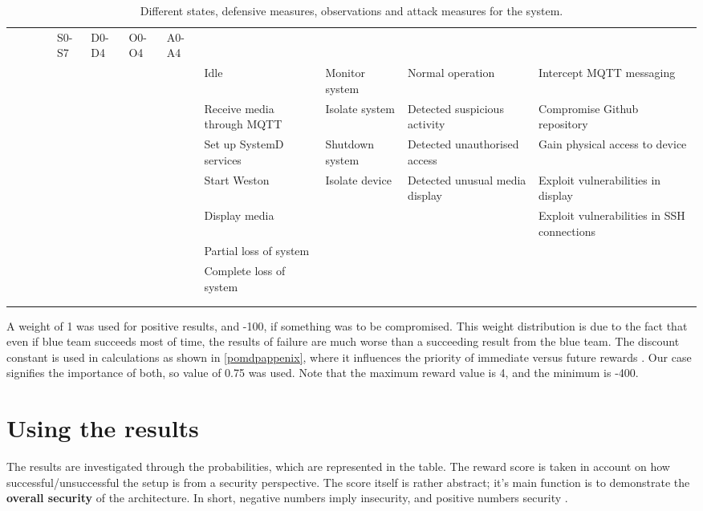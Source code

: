 \begin{landscape}
\begin{table}
\centering
\begin{tabular}{ |c|c|c|c| }
 \hline & & & & S0-S7 & D0-D4 & O0-O4 & A0-A4 \\ & & & & \hline \hline
 & & & & Idle & Monitor system & Normal operation & Intercept MQTT
 messaging \\ & & & & \hline & & & & Receive media through MQTT &
 Isolate system & Detected suspicious activity & Compromise Github
 repository \\ & & & & \hline & & & & Set up SystemD services &
 Shutdown system & Detected unauthorised access & Gain physical access
 to device \\ & & & & \hline & & & & Start Weston & Isolate device &
 Detected unusual media display & Exploit vulnerabilities in display
 \\ & & & & \hline & & & & Display media & & & Exploit vulnerabilities
 in SSH connections \\ & & & & \hline & & & & Partial loss of system &
 \ & \ & \\ & & & & \hline & & & & Complete loss of system & & & \\ &
 & & & \hline & & & & & & & \\ & & & & \hline

\end{tabular}
\caption{Different states, defensive measures, observations and attack
  measures for the system.}
\label{pomdbtable}
\end{table}
\end{landscape}

A weight of 1 was used for positive results, and -100, if something
was to be compromised. This weight distribution is due to the fact
that even if blue team succeeds most of time, the results of failure
are much worse than a succeeding result from the blue team. The
discount constant is used in calculations as shown in
\ref{pomdpappenix}, where it influences the priority of immediate
versus future rewards \cite{mcabeeMarkov}. Our case signifies the
importance of both, so value of 0.75 was used. Note that the maximum
reward value is 4, and the minimum is -400.

\section{Using the results} \label{usingtheresults}

The results are investigated through the probabilities, which are
represented in the table. The reward score is taken in account on how
successful/unsuccessful the setup is from a security perspective. The
score itself is rather abstract; it's main function is to demonstrate
the \textbf{overall security} of the architecture. In short, negative
numbers imply insecurity, and positive numbers security \cite{mcabeeMarkov}.


